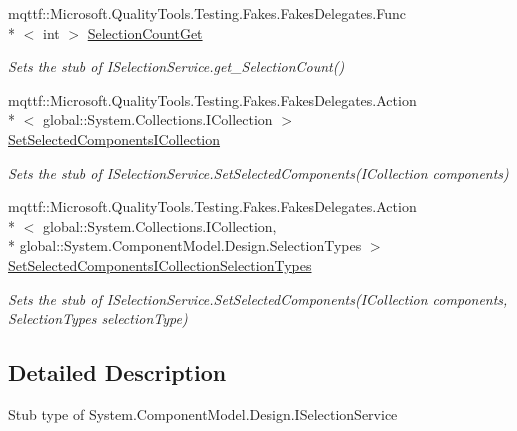 \begin{DoxyCompactItemize}
mqttf\-::\-Microsoft.\-Quality\-Tools.\-Testing.\-Fakes.\-Fakes\-Delegates.\-Func\\*
$<$ int $>$ \hyperlink{class_system_1_1_component_model_1_1_design_1_1_fakes_1_1_stub_i_selection_service_a32e8f1e9315dacbb7ecfc7fb8935fbb5}{Selection\-Count\-Get}
\begin{DoxyCompactList}\small\item\em Sets the stub of I\-Selection\-Service.\-get\-\_\-\-Selection\-Count()\end{DoxyCompactList}\item 
mqttf\-::\-Microsoft.\-Quality\-Tools.\-Testing.\-Fakes.\-Fakes\-Delegates.\-Action\\*
$<$ global\-::\-System.\-Collections.\-I\-Collection $>$ \hyperlink{class_system_1_1_component_model_1_1_design_1_1_fakes_1_1_stub_i_selection_service_a7a684a037005344caaa6590bfed877b2}{Set\-Selected\-Components\-I\-Collection}
\begin{DoxyCompactList}\small\item\em Sets the stub of I\-Selection\-Service.\-Set\-Selected\-Components(\-I\-Collection components)\end{DoxyCompactList}\item 
mqttf\-::\-Microsoft.\-Quality\-Tools.\-Testing.\-Fakes.\-Fakes\-Delegates.\-Action\\*
$<$ global\-::\-System.\-Collections.\-I\-Collection, \\*
global\-::\-System.\-Component\-Model.\-Design.\-Selection\-Types $>$ \hyperlink{class_system_1_1_component_model_1_1_design_1_1_fakes_1_1_stub_i_selection_service_a857ee34b042165483e424118f5262725}{Set\-Selected\-Components\-I\-Collection\-Selection\-Types}
\begin{DoxyCompactList}\small\item\em Sets the stub of I\-Selection\-Service.\-Set\-Selected\-Components(\-I\-Collection components, Selection\-Types selection\-Type)\end{DoxyCompactList}\end{DoxyCompactItemize}


\subsection{Detailed Description}
Stub type of System.\-Component\-Model.\-Design.\-I\-Selection\-Service



